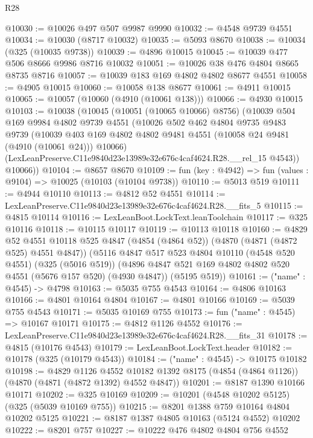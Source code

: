 \begin{lexlean}{R28}
\begin{coremodule}
@10030 := @10026 @497 @507 @9987 @9990
@10032 := @4548 @9739 @4551
@10034 := @10030 (@8717 @10032)
@10035 := @5093 @8670
@10038 := @10034 (@325 (@10035 @9738))
@10039 := @4896 @10015
@10045 := @10039 @477 @506 @8666 @9986 @8716 @10032
@10051 := @10026 @38 @476 @4804 @8665 @8735 @8716
@10057 := @10039 @183 @169 @4802 @4802 @8677 @4551
@10058 := @4905 @10015
@10060 := @10058 @138 @8677
@10061 := @4911 @10015
@10065 := @10057 (@10060 (@4910 (@10061 @138)))
@10066 := @4930 @10015
@10103 := @10038
    (@10045
      (@10051 (@10065 @10066) @8756)
      (@10039
        @504
        @169
        @9984
        @4802
        @9739
        @4551
        (@10026
          @502
          @462
          @4804
          @9735
          @9483
          @9739
          (@10039 @403 @169 @4802 @4802 @9481 @4551 (@10058 @24 @9481 (@4910 (@10061 @24))) @10066)
          (LexLeanPreserve.C11e9840d23e13989e32e676c4caf4624.R28.__rel_15 @4543))
        @10066))
@10104 := @8657 @8670
@10109 := fun (key : @4942) => fun (values : @9104) => @10025 (@10103 (@10104 @9738))
@10110 := @5013 @519
@10111 := @4944 @10110
@10113 := @4812 @52 @4551
@10114 := LexLeanPreserve.C11e9840d23e13989e32e676c4caf4624.R28.__fits_5
@10115 := @4815 @10114
@10116 := LexLeanBoot.LockText.leanToolchain
@10117 := @325 @10116
@10118 := @10115 @10117
@10119 := @10113 @10118
@10160 := @4829
    @52
    @4551
    @10118
    @525
    @4847
    (@4854 (@4864 @52))
    (@4870 (@4871 (@4872 @525) @4551 @4847))
    (@5116
      @4847
      @517
      @523
      @4804
      @10110
      (@4548 @520 @4551)
      (@325 (@5016 @519))
      (@4896 @4847 @521 @169 @4802 @4802 @520 @4551 (@5676 @157 @520) (@4930 @4847))
      (@5195 @519))
@10161 := ("name" : @4545) -> @4798
@10163 := @5035 @755 @4543
@10164 := @4806 @10163
@10166 := @4801 @10164 @4804
@10167 := @4801 @10166
@10169 := @5039 @755 @4543
@10171 := @5035 @10169 @755
@10173 := fun ("name" : @4545) => @10167 @10171
@10175 := @4812 @1126 @4552
@10176 := LexLeanPreserve.C11e9840d23e13989e32e676c4caf4624.R28.__fits_31
@10178 := @4815 (@10176 @4543)
@10179 := LexLeanBoot.LockText.header
@10182 := @10178 (@325 (@10179 @4543))
@10184 := ("name" : @4545) -> @10175 @10182
@10198 := @4829
    @1126
    @4552
    @10182
    @1392
    @8175
    (@4854 (@4864 @1126))
    (@4870 (@4871 (@4872 @1392) @4552 @4847))
@10201 := @8187 @1390 @10166 @10171
@10202 := @325 @10169
@10209 := @10201 (@4548 @10202 @5125) (@325 (@5039 @10169 @755))
@10215 := @8201 @1388 @759 @10164 @4804 @10202 @5125
@10221 := @8187 @1387 @4805 @10163 (@5124 @4552) @10202
@10222 := @8201 @757
@10227 := @10222 @476 @4802 @4804 @756 @4552

\end{coremodule}
\end{lexlean}
